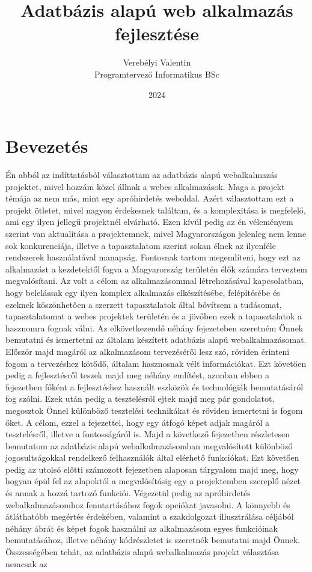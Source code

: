 \documentclass[]{thesis-ekf}
\theoremstyle{definition}
\theoremstyle{remark}
\begin{document}
	\title{Adatbázis alapú web alkalmazás fejlesztése}
	\author{Verebélyi Valentin\\Programtervező Informatikus BSc}
	\date{2024}
	\maketitle
	\tableofcontents
	
	\chapter*{Bevezetés}
	Én abból az indíttatásból választottam az adatbázis alapú webalkalmazás projektet, mivel hozzám közel állnak a webes alkalmazások. Maga a projekt témája az nem más, mint egy apróhirdetés weboldal. Azért választottam ezt a projekt ötletet, mivel nagyon érdekesnek találtam, és a komplexitása is megfelelő, ami egy ilyen jellegű projektnél elvárható. Ezen kívül pedig az én véleményem szerint van aktualitása a projektemnek, mivel Magyarországon jelenleg nem lenne sok konkurenciája, illetve a tapasztalatom szerint sokan élnek az ilyenféle rendszerek használatával manapság. Fontosnak tartom megemlíteni, hogy ezt az alkalmazást a kezdetektől fogva a Magyarország területén élők számára terveztem megvalósítani. Az volt a célom az alkalmazásommal létrehozásával kapcsolatban, hogy belelássak egy ilyen komplex alkalmazás elkészítésébe, felépítésébe és ezeknek köszönhetően a szerzett tapasztalatok által bővítsem a tudásomat, tapasztalatomat a webes projektek területén és a jövőben ezek a tapasztalatok a hasznomra fognak válni. Az elkövetkezendő néhány fejezeteben szeretném Önnek bemutatni és ismertetni az általam készített adatbázis alapú webalkalmazásomat. Először majd magáról az alkalmazásom tervezéséről lesz szó, röviden érinteni fogom a tervezéshez kötődő, általam hasznosnak vélt információkat. Ezt követően pedig a fejlesztésről teszek majd meg néhány említést, azonban ebben a fejezetben főként a fejlesztéshez használt eszközök és technológiák bemutatásáról fog szólni. Ezek után pedig a tesztelésről ejtek majd meg pár gondolatot, megosztok Önnel különböző tesztelési technikákat és röviden ismertetni is fogom őket. A célom, ezzel a fejezettel, hogy egy átfogó képet adjak magáról a tesztelésről, illetve a fontosságáról is. Majd a következő fejezetben részletesen bemutatom az adatbázis alapú webalkalmazásomban megvalósított különböző jogosultságokkal rendelkező felhasználók által elérhető funkciókat. Ezt követően pedig az utolsó előtti számozott fejezetben alaposan tárgyalom majd meg, hogy hogyan épül fel az alapoktól a megvalósításig egy a projektemben szereplő nézet és annak a hozzá tartozó funkciói. Végezetül pedig az apróhirdetés webalkalmazásomhoz fenntartásához fogok opciókat javasolni. A könnyebb és átláthatóbb megértés érdekében, valamint a szakdolgozat illusztrálása céljából néhány ábrát és képet fogok használni az alkalmazásom egyes funkcióinak bemutatásához, illetve néhány kódrészletet is szeretnék bemutatni majd Önnek. Összességében tehát, az adatbázis alapú webalkalmazás projekt választása nemcsak az 
\end{document}
